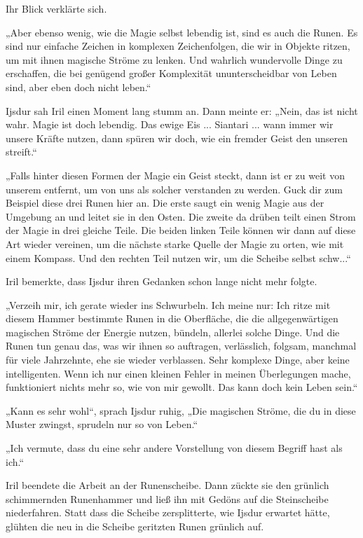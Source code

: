 Ihr Blick verklärte sich.

„Aber ebenso wenig, wie die Magie selbst lebendig ist, sind es auch die Runen. Es sind nur einfache Zeichen in komplexen Zeichenfolgen, die wir in Objekte ritzen, um mit ihnen magische Ströme zu lenken. Und wahrlich wundervolle Dinge zu erschaffen, die bei genügend großer Komplexität ununterscheidbar von Leben sind, aber eben doch nicht leben.“

Ijsdur sah Iril einen Moment lang stumm an. Dann meinte er: „Nein, das ist nicht wahr. Magie ist doch lebendig. Das ewige Eis ... Siantari ... wann immer wir unsere Kräfte nutzen, dann spüren wir doch, wie ein fremder Geist den unseren streift.“

„Falls hinter diesen Formen der Magie ein Geist steckt, dann ist er zu weit von unserem entfernt, um von uns als solcher verstanden zu werden. Guck dir zum Beispiel diese drei Runen hier an. Die erste saugt ein wenig Magie aus der Umgebung an und leitet sie in den Osten. Die zweite da drüben teilt einen Strom der Magie in drei gleiche Teile. Die beiden linken Teile können wir dann auf diese Art wieder vereinen, um die nächste starke Quelle der Magie zu orten, wie mit einem Kompass. Und den rechten Teil nutzen wir, um die Scheibe selbst schw...“

Iril bemerkte, dass Ijsdur ihren Gedanken schon lange nicht mehr folgte.

„Verzeih mir, ich gerate wieder ins Schwurbeln. Ich meine nur: Ich ritze mit diesem Hammer bestimmte Runen in die Oberfläche, die die allgegenwärtigen magischen Ströme der Energie nutzen, bündeln, allerlei solche Dinge. Und die Runen tun genau das, was wir ihnen so auftragen, verlässlich, folgsam, manchmal für viele Jahrzehnte, ehe sie wieder verblassen. Sehr komplexe Dinge, aber keine intelligenten. Wenn ich nur einen kleinen Fehler in meinen Überlegungen mache, funktioniert nichts mehr so, wie von mir gewollt. Das kann doch kein Leben sein.“

„Kann es sehr wohl“, sprach Ijsdur ruhig, „Die magischen Ströme, die du in diese Muster zwingst, sprudeln nur so von Leben.“

„Ich vermute, dass du eine sehr andere Vorstellung von diesem Begriff hast als ich.“

Iril beendete die Arbeit an der Runenscheibe. Dann zückte sie den grünlich schimmernden Runenhammer und ließ ihn mit Gedöns auf die Steinscheibe niederfahren. Statt dass die Scheibe zersplitterte, wie Ijsdur erwartet hätte, glühten die neu in die Scheibe geritzten Runen grünlich auf.

